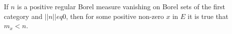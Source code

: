 If $n$ is a positive regular Borel measure vanishing on Borel sets of the first category and $||n|| 
eq 0$, then for some positive non-zero $x$ in $E$ it is true that $m_x < n$.
